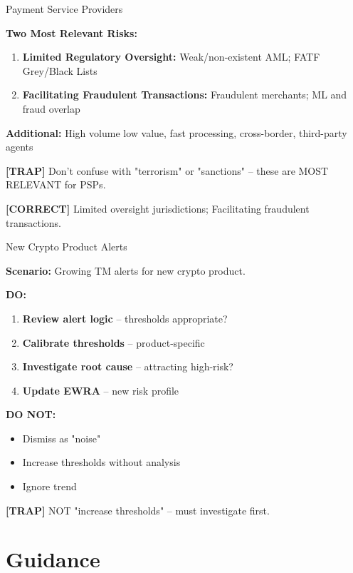 \documentclass[8pt,aspectratio=169,fontsize=7pt]{beamer}
\renewcommand{\tiny}{\fontsize{4pt}{5pt}\selectfont}
\renewcommand{\normalsize}{\fontsize{8pt}{9pt}\selectfont}
\newcommand{\trap}[1]{%
	\begin{block}{\textcolor{redtrap}{\textbf{[TRAP]}}}
		\textcolor{redtrap}{\tiny #1}
	\end{block}
}
\newcommand{\correct}[1]{%
	\begin{block}{\textcolor{greencorrect}{\textbf{[CORRECT]}}}
		\textcolor{greencorrect}{\tiny #1}
	\end{block}
}
\begin{document}
	\begin{frame}{\normalsize Payment Service Providers}
		
		\textbf{Two Most Relevant Risks:}
		\begin{enumerate}
			\item \textbf{Limited Regulatory Oversight:} Weak/non-existent AML; FATF Grey/Black Lists
			\item \textbf{Facilitating Fraudulent Transactions:} Fraudulent merchants; ML and fraud overlap
		\end{enumerate}
		
		\textbf{Additional:} High volume low value, fast processing, cross-border, third-party agents
		
		\trap{Don't confuse with "terrorism" or "sanctions" -- these are MOST RELEVANT for PSPs.}
		
		\correct{Limited oversight jurisdictions; Facilitating fraudulent transactions.}
	\end{frame}
	
	\begin{frame}{\normalsize New Crypto Product Alerts}
		
		\textbf{Scenario:} Growing TM alerts for new crypto product.
		
		\textbf{DO:}
		\begin{enumerate}
			\item \textbf{Review alert logic} -- thresholds appropriate?
			\item \textbf{Calibrate thresholds} -- product-specific
			\item \textbf{Investigate root cause} -- attracting high-risk?
			\item \textbf{Update EWRA} -- new risk profile
		\end{enumerate}
		
		\textbf{DO NOT:}
		\begin{itemize}
			\item Dismiss as "noise"
			\item Increase thresholds without analysis
			\item Ignore trend
		\end{itemize}
		
		\trap{NOT "increase thresholds" -- must investigate first.}
	\end{frame}
	
	\section{Guidance}
	
\end{document}
